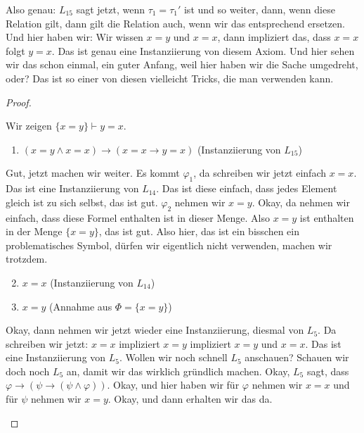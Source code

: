 \begin{spoken-clean}[00:58:57 - 01:00:07]
Also genau: $L_{15}$ sagt jetzt, wenn $\tau_1 = \tau_1'$ ist und so weiter, dann, wenn diese Relation gilt, dann gilt die Relation auch, wenn wir das entsprechend ersetzen. Und hier haben wir: Wir wissen $x=y$ und $x=x$, dann impliziert das, dass $x=x$ folgt $y=x$. Das ist genau eine Instanziierung von diesem Axiom. Und hier sehen wir das schon einmal, ein guter Anfang, weil hier haben wir die Sache umgedreht, oder? Das ist so einer von diesen vielleicht Tricks, die man verwenden kann.
\end{spoken-clean}

\begin{proof}
\begin{math-stroke}
Wir zeigen $\{x = y\} \vdash y = x$.
\begin{enumerate}[label=$\varphi_{\mathbf{\arabic*}}:$]
    \setcounter{enumi}{0} \item $(x = y \wedge x = x) \rightarrow (x = x \rightarrow y = x)$ \hfill (Instanziierung von $L_{15}$)
\end{enumerate}
\end{math-stroke}

\begin{spoken-clean}[01:00:08 - 01:01:31]
Gut, jetzt machen wir weiter. Es kommt $\varphi_1$, da schreiben wir jetzt einfach $x=x$. Das ist eine Instanziierung von $L_{14}$. Das ist diese einfach, dass jedes Element gleich ist zu sich selbst, das ist gut. $\varphi_2$ nehmen wir $x=y$. Okay, da nehmen wir einfach, dass diese Formel enthalten ist in dieser Menge. Also $x=y$ ist enthalten in der Menge $\{x=y\}$, das ist gut. Also hier, das ist ein bisschen ein problematisches Symbol, dürfen wir eigentlich nicht verwenden, machen wir trotzdem.
\end{spoken-clean}

\begin{math-stroke}
\begin{enumerate}[label=$\varphi_{\mathbf{\arabic*}}:$]
    \setcounter{enumi}{1} \item $x = x$ \hfill (Instanziierung von $L_{14}$)
    \item $x = y$ \hfill (Annahme aus $\Phi = \{x = y\}$)
\end{enumerate}
\end{math-stroke}

\begin{spoken-clean}[01:01:32 - 01:02:12]
Okay, dann nehmen wir jetzt wieder eine Instanziierung, diesmal von $L_5$. Da schreiben wir jetzt: $x=x$ impliziert $x=y$ impliziert $x=y$ und $x=x$. Das ist eine Instanziierung von $L_5$. Wollen wir noch schnell $L_5$ anschauen? Schauen wir doch noch $L_5$ an, damit wir das wirklich gründlich machen. Okay, $L_5$ sagt, dass $\varphi \rightarrow (\psi \rightarrow (\psi \wedge \varphi))$. Okay, und hier haben wir für $\varphi$ nehmen wir $x=x$ und für $\psi$ nehmen wir $x=y$. Okay, und dann erhalten wir das da.
\end{spoken-clean}


\end{proof}

